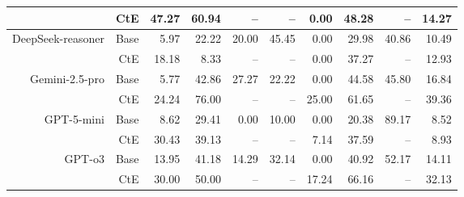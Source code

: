 \begin{table}[!t]
\begin{tabular}{r r !{\color{white!80!black} \vline} r r r r r !{\color{white!80!black} \vline} r r r}
 & CtE & \textcolor{blue!60!black}{47.27} & \textcolor{blue!60!black}{60.94} & \textcolor{blue!60!black}{--} & \textcolor{blue!60!black}{--} & \textcolor{blue!60!black}{0.00} & \textcolor{blue!60!black}{48.28} & \textcolor{blue!60!black}{--} & \textcolor{blue!60!black}{14.27} \\ \midrule
 \sf DeepSeek-reasoner & Base & \textcolor{blue!60!black}{5.97} & 22.22 & \textcolor{blue!60!black}{20.00} & \textcolor{blue!60!black}{45.45} & 0.00 & 29.98 & \textcolor{blue!60!black}{40.86} & \textcolor{blue!60!black}{10.49} \\
 & CtE & \textcolor{blue!60!black}{18.18} & \textcolor{blue!60!black}{8.33} & \textcolor{blue!60!black}{--} & \textcolor{blue!60!black}{--} & \textcolor{blue!60!black}{0.00} & \textcolor{blue!60!black}{37.27} & \textcolor{blue!60!black}{--} & \textcolor{blue!60!black}{12.93} \\ \midrule
 \sf Gemini-2.5-pro & Base & 5.77 & \textcolor{blue!60!black}{42.86} & \textcolor{blue!60!black}{27.27} & \textcolor{blue!60!black}{22.22} & 0.00 & 44.58 & \textcolor{blue!60!black}{45.80} & \textcolor{blue!60!black}{16.84} \\
 & CtE & \textcolor{blue!60!black}{24.24} & \textcolor{blue!60!black}{76.00} & \textcolor{blue!60!black}{--} & \textcolor{blue!60!black}{--} & \textcolor{blue!60!black}{25.00} & \textcolor{blue!60!black}{61.65} & \textcolor{blue!60!black}{--} & \textcolor{blue!60!black}{39.36} \\ \midrule
 \sf GPT-5-mini & Base & \textcolor{blue!60!black}{8.62} & \textcolor{blue!60!black}{29.41} & \textcolor{blue!60!black}{0.00} & \textcolor{blue!60!black}{10.00} & \textcolor{blue!60!black}{0.00} & \textcolor{blue!60!black}{20.38} & \textcolor{blue!60!black}{89.17} & \textcolor{blue!60!black}{8.52} \\
 & CtE & \textcolor{blue!60!black}{30.43} & \textcolor{blue!60!black}{39.13} & \textcolor{blue!60!black}{--} & \textcolor{blue!60!black}{--} & \textcolor{blue!60!black}{7.14} & \textcolor{blue!60!black}{37.59} & \textcolor{blue!60!black}{--} & \textcolor{blue!60!black}{8.93} \\ \midrule
 \sf GPT-o3 & Base & \textcolor{blue!60!black}{13.95} & \textcolor{blue!60!black}{41.18} & \textcolor{blue!60!black}{14.29} & \textcolor{blue!60!black}{32.14} & \textcolor{blue!60!black}{0.00} & \textcolor{blue!60!black}{40.92} & \textcolor{blue!60!black}{52.17} & \textcolor{blue!60!black}{14.11} \\
 & CtE & \textcolor{blue!60!black}{30.00} & \textcolor{blue!60!black}{50.00} & \textcolor{blue!60!black}{--} & \textcolor{blue!60!black}{--} & \textcolor{blue!60!black}{17.24} & \textcolor{blue!60!black}{66.16} & \textcolor{blue!60!black}{--} & \textcolor{blue!60!black}{32.13} \\ \midrule

\end{tabular}
\end{table}
